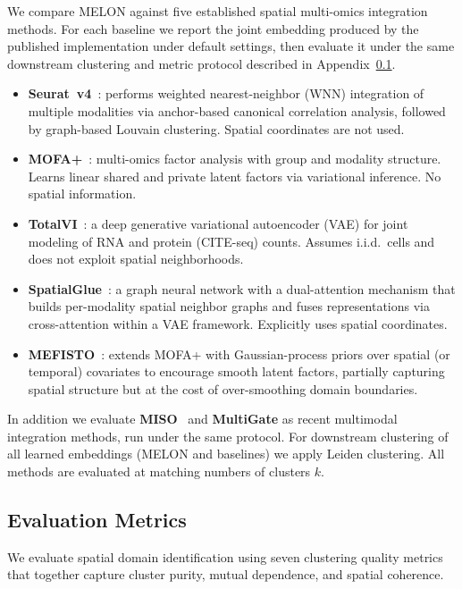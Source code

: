 \documentclass{article}
\theoremstyle{plain}
\theoremstyle{definition}
\begin{document}
We compare MELON against five established spatial multi-omics integration methods. For each baseline we report the joint embedding produced by the published implementation under default settings, then evaluate it under the same downstream clustering and metric protocol described in Appendix~\ref{app:metrics}.

\begin{itemize}
    \item \textbf{Seurat~v4}~\cite{hao2021seurat}: performs weighted nearest-neighbor (WNN) integration of multiple modalities via anchor-based canonical correlation analysis, followed by graph-based Louvain clustering. Spatial coordinates are not used.
    \item \textbf{MOFA+}~\cite{argelaguet2020mofa}: multi-omics factor analysis with group and modality structure. Learns linear shared and private latent factors via variational inference. No spatial information.
    \item \textbf{TotalVI}~\cite{gayoso2021totalvi}: a deep generative variational autoencoder (VAE) for joint modeling of RNA and protein (CITE-seq) counts. Assumes i.i.d.\ cells and does not exploit spatial neighborhoods.
    \item \textbf{SpatialGlue}~\cite{long2024spatialglue}: a graph neural network with a dual-attention mechanism that builds per-modality spatial neighbor graphs and fuses representations via cross-attention within a VAE framework. Explicitly uses spatial coordinates.
    \item \textbf{MEFISTO}~\cite{velten2022mefisto}: extends MOFA+ with Gaussian-process priors over spatial (or temporal) covariates to encourage smooth latent factors, partially capturing spatial structure but at the cost of over-smoothing domain boundaries.
\end{itemize}

In addition we evaluate \textbf{MISO}~\cite{xu2024miso} and \textbf{MultiGate} as recent multimodal integration methods, run under the same protocol. For downstream clustering of all learned embeddings (MELON and baselines) we apply Leiden clustering. All methods are evaluated at matching numbers of clusters $k$.

\subsection{Evaluation Metrics}\label{app:metrics}

We evaluate spatial domain identification using seven clustering quality metrics that together capture cluster purity, mutual dependence, and spatial coherence.
\end{document}
